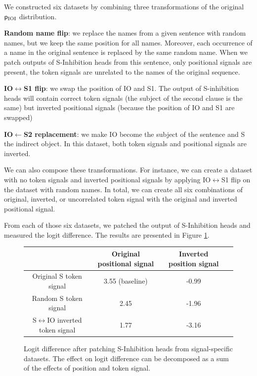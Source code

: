 We constructed six datasets by combining three transformations of the original $\mathsf{p}_{\mathrm{IOI}}$ distribution.
\begin{compactitem}
    \item \textbf{Random name flip}: we replace the names from a given sentence with random names, but we keep the same position for all names. Moreover, each occurrence of a name in the original sentence is replaced by the same random name. When we patch outputs of S-Inhibition heads from this sentence, only positional signals are present, the token signals are unrelated to the names of the original sequence.
    \item \textbf{IO$\leftrightarrow$S1 flip}: we swap the position of IO and S1. The output of S-inhibition heads will contain correct token signals (the subject of the second clause is the same) but inverted positional signals (because the position of IO and S1 are swapped)
    \item \textbf{IO$\leftarrow$S2 replacement}: we make IO become the subject of the sentence and S the indirect object. In this dataset, both token signals and positional signals are inverted.
\end{compactitem}
We can also compose these transformations. For instance, we can create a dataset with no token signals and inverted positional signals by applying IO$\leftrightarrow$S1 flip on the dataset with random names. In total, we can create all six combinations of original, inverted, or uncorrelated token signal with the original and inverted positional signal.

From each of those six datasets, we patched the output of S-Inhibition heads and measured the logit difference. The results are presented in Figure \ref{table:signals_logit_diff}.



\begin{figure}
\begin{center}
\begin{tabular}{ |c|c|c|c|} 
\hline
\textbf{~} & \textbf{Original positional signal} & \textbf{Inverted position signal} \\ 
\hline 
Original S token signal & 3.55 (baseline) & -0.99  \\
\hline
Random S token signal& 2.45 & -1.96  \\
\hline
S$\leftrightarrow$IO inverted token signal & 1.77 & -3.16  \\
\hline
\end{tabular}
\caption{Logit difference after patching S-Inhibition heads from signal-specific datasets. The effect on logit difference can be decomposed as a sum of the effects of position and token signal. }
\label{table:signals_logit_diff}
\end{center}
\end{figure}

